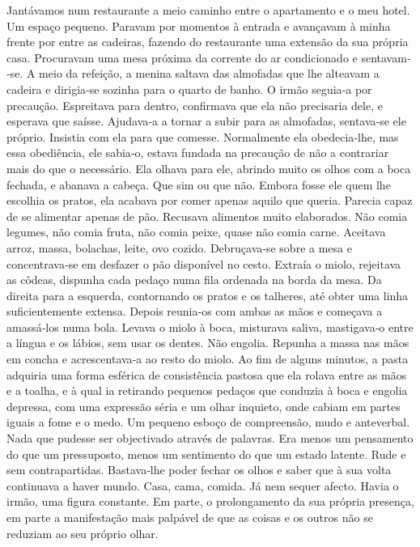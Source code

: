 Jantávamos num restaurante a meio caminho entre o apartamento e o meu
hotel. Um espaço pequeno. Paravam por momentos à entrada e avançavam à
minha frente por entre as cadeiras, fazendo do restaurante uma extensão
da sua própria casa. Procuravam uma mesa próxima da corrente do ar
condicionado e sentavam­‑se. A meio da refeição, a menina saltava das
almofadas que lhe alteavam a cadeira e dirigia­‑se sozinha para o quarto
de banho. O irmão seguia­‑a por precaução. Espreitava para dentro,
confirmava que ela não precisaria dele, e esperava que saísse.
Ajudava­‑a a tornar a subir para as almofadas, sentava­‑se ele próprio.
Insistia com ela para que comesse. Normalmente ela obedecia­‑lhe, mas
essa obediência, ele sabia­‑o, estava fundada na precaução de não a
contrariar mais do que o necessário. Ela olhava para ele, abrindo muito
os olhos com a boca fechada, e abanava a cabeça. Que sim ou que não.
Embora fosse ele quem lhe escolhia os pratos, ela acabava por comer
apenas aquilo que queria. Parecia capaz de se alimentar apenas de pão.
Recusava alimentos muito elaborados. Não comia legumes, não comia fruta,
não comia peixe, quase não comia carne. Aceitava arroz, massa, bolachas,
leite, ovo cozido. Debruçava­‑se sobre a mesa e concentrava­‑se em
desfazer o pão disponível no cesto. Extraía o miolo, rejeitava as
côdeas, dispunha cada pedaço numa fila ordenada na borda da mesa. Da
direita para a esquerda, contornando os pratos e os talheres, até obter
uma linha suficientemente extensa. Depois reunia­‑os com ambas as mãos e
começava a amassá­‑los numa bola. Levava o miolo à boca, misturava
saliva, mastigava­‑o entre a língua e os lábios, sem usar os dentes. Não
engolia. Repunha a massa nas mãos em concha e acrescentava­‑a ao resto
do miolo. Ao fim de alguns minutos, a pasta adquiria uma forma esférica
de consistência pastosa que ela rolava entre as mãos e a toalha, e à
qual ia retirando pequenos pedaços que conduzia à boca e engolia
depressa, com uma expressão séria e um olhar inquieto, onde cabiam em
partes iguais a fome e o medo. Um pequeno esboço de compreensão, mudo e
anteverbal. Nada que pudesse ser objectivado através de palavras. Era
menos um pensamento do que um pressuposto, menos um sentimento do que um
estado latente. Rude e sem contrapartidas. Bastava­‑lhe poder fechar os
olhos e saber que à sua volta continuava a haver mundo. Casa, cama,
comida. Já nem sequer afecto. Havia o irmão, uma figura constante. Em
parte, o prolongamento da sua própria presença, em parte a manifestação
mais palpável de que as coisas e os outros não se reduziam ao seu
próprio olhar.

